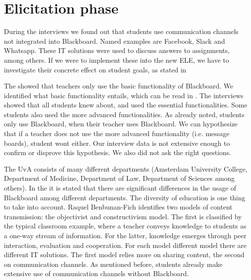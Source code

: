 \chapter{Elicitation phase}
\begin{itemize}

	During the interviews we found out that students use communication channels not integrated into Blackboard. Named examples are Facebook, Slack and Whatsapp. These IT solutions were used to discuss answers to assignments, among others. If we were to implement these into the new ELE, we have to investigate their concrete effect on student goals, as stated in 

	The \rreport showed that teachers only use the basic functionality of Blackboard. We identified what basic functionality entails, which can be read in . The interviews showed that all students knew about, and used the essential functionalities. Some students also used the more advanced functionalities. As already noted, students only use Blackboard, when their teacher uses Blackboard. We can hypothesize that if a teacher does not use the more advanced functionality (i.e. message boards), student wont either. Our interview data is not extensive enough to confirm or disprove this hypothesis. We also did not ask the right questions. 
	
	
	The UvA consists of many different departments (Amsterdam University College, Department of Medicine, Department of Law, Department of Sciences among others). In the \rreport it is stated that there are significant differences in the usage of Blackboard among different departments. The diversity of education is one thing to take into account. Raquel Benbunan-Fich \cite{improveEducationWithIt} identifies two models of content transmission: the objectivist and constructivism model. The first is classified by the typical classroom example, where a teacher conveys knowledge to students as a one-way stream of information. For the latter, knowledge emerges through peer interaction, evaluation and cooperation. For each model different model there are different IT solutions. The first model relies more on sharing content, the second on communication channels. As mentioned before, students already make extensive use of communication channels without Blackboard. \\
	

\end{itemize}
